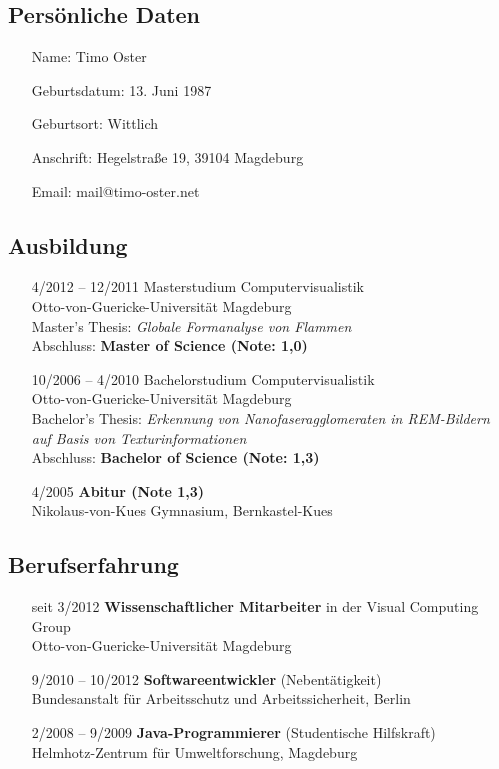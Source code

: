\documentclass[oneside]{scrartcl}
\begin{document}
\subsection*{Persönliche Daten}
%
\begin{enumerate}
    \item[Name:] Timo Oster
    \item[Geburtsdatum:] 13. Juni 1987
    \item[Geburtsort:] Wittlich
    \item[Anschrift:] Hegelstraße 19, 39104 Magdeburg
    \item[Email:] mail@timo-oster.net
\end{enumerate}
%
\subsection*{Ausbildung}
%
\begin{enumerate}
    \item[4/2012 -- 12/2011] Masterstudium Computervisualistik\\
                   Otto-von-Guericke-Universität Magdeburg\\
                   Master's Thesis: \emph{Globale Formanalyse von Flammen}\\
                   Abschluss: \textbf{Master of Science (Note: 1,0)}
    \item[10/2006 -- 4/2010] Bachelorstudium Computervisualistik\\
                             Otto-von-Guericke-Universität Magdeburg\\
                             Bachelor's Thesis: \emph{Erkennung von Nanofaseragglomeraten in REM-Bildern auf Basis von Texturinformationen}\\
                             Abschluss: \textbf{Bachelor of Science (Note: 1,3)}
    \item[4/2005] \textbf{Abitur (Note 1,3)}\\
                  Nikolaus-von-Kues Gymnasium, Bernkastel-Kues
\end{enumerate}
%
\subsection*{Berufserfahrung}
%
\begin{enumerate}
    \item[seit 3/2012] \textbf{Wissenschaftlicher Mitarbeiter} in der Visual Computing Group\\
                       Otto-von-Guericke-Universität Magdeburg
    \item[9/2010 -- 10/2012] \textbf{Softwareentwickler} (Nebentätigkeit)\\
                             Bundesanstalt für Arbeitsschutz und Arbeitssicherheit, Berlin
    \item[2/2008 -- 9/2009] \textbf{Java-Programmierer} (Studentische Hilfskraft)\\
                            Helmhotz-Zentrum für Umweltforschung, Magdeburg
\end{enumerate}
%
\end{document}
